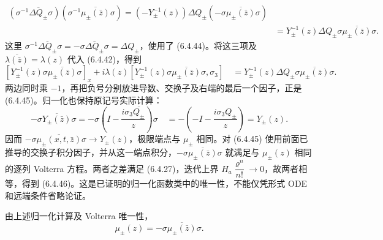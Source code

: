 \documentclass[lang=cn,scheme=chinese,mode=simple,device=normal,color=blue,
math=cm,thmcnt=section,12pt]{elegantbook}
\newcommand{\conj}[1]{\overline{#1}}
\newcommand{\eqq}[2]{\tag{#1}\label{eq:#1}#2}
\begin{document}
\begin{callout}
\[\begin{aligned}
            (\sigma^{-1}\overline{\Delta Q_\pm}\sigma)
            (\sigma^{-1}\overline{\mu_\pm(\bar z)}\sigma) =(-Y_\pm^{-1}(z))\Delta Q_\pm(-\sigma\overline{\mu_\pm(\bar z)}\sigma) \\
             & =Y_\pm^{-1}(z)\Delta Q_\pm\sigma\overline{\mu_\pm(\bar z)}\sigma.
        \end{aligned}
    \]
    这里 $\sigma^{-1}\overline{\Delta Q_\pm}\sigma=-\sigma\overline{\Delta Q_\pm}\sigma=\Delta Q_\pm$，使用了 (6.4.44)。将这三项及 $\overline{\lambda(\bar z)}=\lambda(z)$ 代入 (6.4.42)，得到
    \[
        [Y_\pm^{-1}(z)\sigma\overline{\mu_\pm(\bar z)}\sigma]_x
        +i\lambda(z)[Y_\pm^{-1}(z)\sigma\overline{\mu_\pm(\bar z)}\sigma,\sigma_3]\quad
        =Y_\pm^{-1}(z)\Delta Q_\pm\sigma\overline{\mu_\pm(\bar z)}\sigma.
    \]
    两边同时乘 $-1$，再把负号分别放进导数、交换子及右端的最后一个因子，正是 (6.4.45)。归一化也保持原记号实际计算：
    \[
        -\sigma\overline{Y_\pm(\bar z)}\sigma
        =-\sigma\left(I-\dfrac{i\sigma_3\overline{Q_\pm}}{z}\right)\sigma\quad
        =-\left(-I-\dfrac{i\sigma_3Q_\pm}{z}\right)=Y_\pm(z).
    \]
    因而 $-\sigma\overline{\mu_\pm(x,t,\bar z)}\sigma\to Y_\pm(z)$，极限端点与 $\mu_\pm$ 相同。对 (6.4.45) 使用前面已推导的交换子积分因子，并从这一端点积分，$-\sigma\overline{\mu_\pm(\bar z)}\sigma$ 就满足与 $\mu_\pm(z)$ 相同的逐列 Volterra 方程。两者之差满足 (6.4.27)，迭代上界 $H_a\dfrac{\varrho^n}{n!}\to0$，故两者相等，得到 (6.4.46)。这是已证明的归一化函数类中的唯一性，不能仅凭形式 ODE 和远端条件省略论证。
\end{callout}

由上述归一化计算及 Volterra 唯一性，
\begin{equation}\eqq{6.4.46}{\mu_\pm(z)=-\sigma\conj{\mu_\pm(\bar z)}\sigma.}\end{equation}
\end{document}
